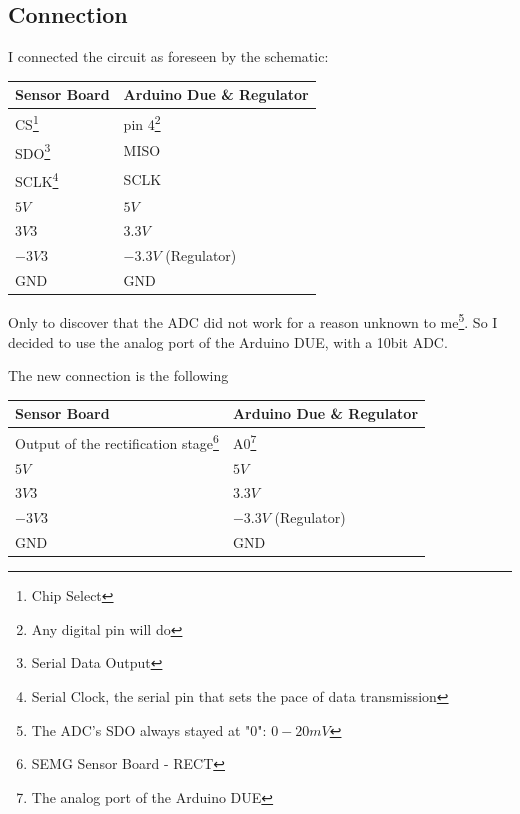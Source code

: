 \documentclass[a4paper, 10pt, final]{article} %
\begin{document}
    \subsection{Connection}
    I connected the circuit as foreseen by the schematic:
    \begin{center}
    \begin{tabular}{ ||l|l|| }
        \hline
        \multicolumn{1}{||l|}{Sensor Board} & \multicolumn{1}{|l||}{Arduino Due \& Regulator} \\
        \hline
        \hline
        CS\footnote{Chip Select} & pin 4\footnote{Any digital pin will do}\\
        \hline
        SDO\footnote{Serial Data Output} & MISO\\
        \hline
        SCLK\footnote{Serial Clock, the serial pin that sets the pace of data transmission} & SCLK\\
        \hline
        $5V$   & $5V$\\
        \hline
        $3V3$  & $3.3V$\\
        \hline
        $-3V3$ & $-3.3V$ (Regulator)\\
        \hline
        GND    & GND\\
        \hline
    \end{tabular}
    \end{center}
    \noindent Only to discover that the ADC did not work for a reason unknown to me\footnote{The ADC's SDO always stayed at "$0$": $0-20mV$}.
    So I decided to use the analog port of the Arduino DUE, with a 10bit ADC.

    \noindent The new connection is the following
    \begin{center}
        \begin{tabular}{ ||l|l|| }
            \hline
            \multicolumn{1}{||l|}{Sensor Board} & \multicolumn{1}{|l||}{Arduino Due \& Regulator} \\
            \hline
            \hline
            Output of the rectification stage\footnote{SEMG Sensor Board - RECT} & A0\footnote{The analog port of the Arduino DUE}\\
            \hline
            $5V$   & $5V$\\
            \hline
            $3V3$  & $3.3V$\\
            \hline
            $-3V3$ & $-3.3V$ (Regulator)\\
            \hline
            GND    & GND\\
            \hline
        \end{tabular}
    \end{center}
\end{document}
